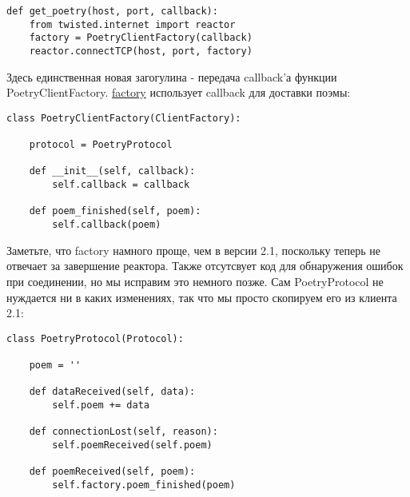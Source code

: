  \begin{verbatim}
def get_poetry(host, port, callback):
    from twisted.internet import reactor
    factory = PoetryClientFactory(callback)
    reactor.connectTCP(host, port, factory)
\end{verbatim} 


Здесь единственная новая загогулина - передача callback'а  
функции PoetryClientFactory. 
\href{http://github.com/jdavisp3/twisted-intro/blob/master/twisted-client-3/get-poetry.py#L66}{factory} 
использует callback для доставки поэмы:

 \begin{verbatim}
class PoetryClientFactory(ClientFactory):

    protocol = PoetryProtocol

    def __init__(self, callback):
        self.callback = callback

    def poem_finished(self, poem):
        self.callback(poem)
\end{verbatim} 


Заметьте, что factory намного проще, чем в версии 2.1, 
поскольку теперь не отвечает за завершение реактора. 
Также отсутсвует код для обнаружения ошибок при соединении, 
но мы исправим это немного позже. Сам PoetryProtocol 
не нуждается ни в каких изменениях, так что мы просто 
скопируем его из клиента 2.1: 

 \begin{verbatim}
class PoetryProtocol(Protocol):

    poem = ''

    def dataReceived(self, data):
        self.poem += data

    def connectionLost(self, reason):
        self.poemReceived(self.poem)

    def poemReceived(self, poem):
        self.factory.poem_finished(poem)
\end{verbatim} 


